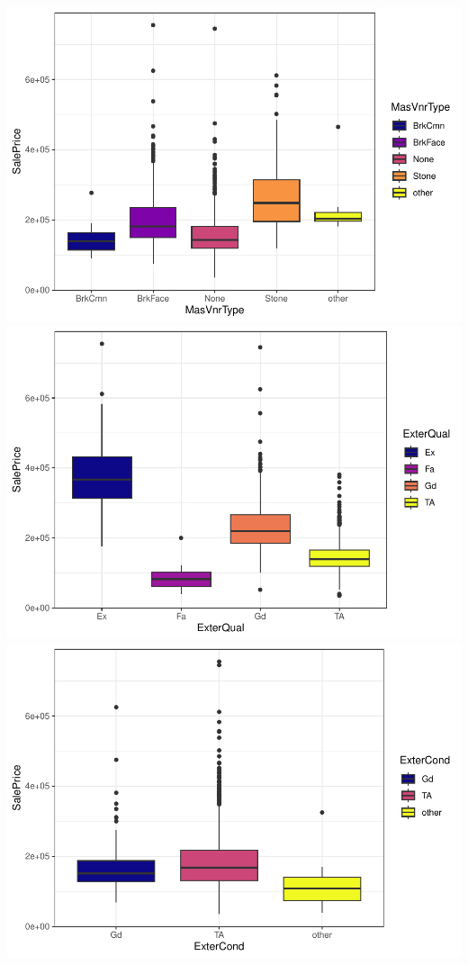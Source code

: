 \documentclass[
]{article}
\begin{document}
\includegraphics{report_files/figure-latex/categorical variables-13.pdf}
\includegraphics{report_files/figure-latex/categorical variables-14.pdf}
\includegraphics{report_files/figure-latex/categorical variables-15.pdf}
\end{document}
